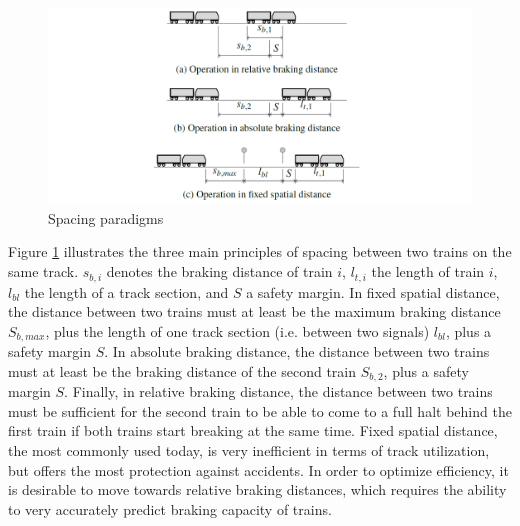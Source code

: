 \begin{figure}[H]
	\centering
	\includegraphics[width=\linewidth]{./pic/abstaende}
	\caption{Spacing paradigms \cite{Pfaff2017}}
	\label{fig:train_spacing}
\end{figure}

\par\noindent
Figure \ref{fig:train_spacing} illustrates the three main principles of spacing between two trains on the same track. $s_{b,i}$ denotes the braking distance of train $i$, $l_{t,i}$ the length of train $i$, $l_{bl}$ the length of a track section, and $S$ a safety margin. In fixed spatial distance, the distance between two trains must at least be the maximum braking distance $S_{b,max}$, plus the length of one track section (i.e. between two signals) $l_{bl}$, plus a safety margin $S$. In absolute braking distance, the distance between two trains must at least be the braking distance of the second train $S_{b,2}$, plus a safety margin $S$. Finally, in relative braking distance, the distance between two trains must be sufficient for the second train to be able to come to a full halt behind the first train if both trains start breaking at the same time. Fixed spatial distance, the most commonly used today, is very inefficient in terms of track utilization, but offers the most protection against accidents. In order to optimize efficiency, it is desirable to move towards relative braking distances, which requires the ability to very accurately predict braking capacity of trains.

